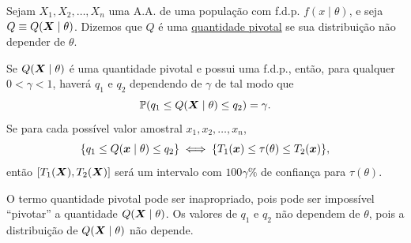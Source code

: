 \begin{definition}
Sejam $X_1,X_2,\ldots,X_n$ uma A.A. de uma população com f.d.p. $f(x\mid\theta)$, e seja $Q\equiv Q(\bm{X}\mid\theta)$. Dizemos que $Q$ é uma \underline{quantidade pivotal} se sua distribuição não depender de $\theta$.
\end{definition}

\begin{theorem}
Se $Q(\bm{X}\mid\theta)$ é uma quantidade pivotal e possui uma f.d.p., então, para qualquer $0<\gamma<1$, haverá $q_1$ e $q_2$ dependendo de $\gamma$ de tal modo que
\begin{equation}
\mathbb{P}(q_1\leq Q(\bm{X}\mid\theta)\leq q_2) = \gamma.
\end{equation}
Se para cada possível valor amostral $x_1,x_2,\ldots,x_n$,
\begin{equation}
\{q_1\leq Q(\bm{x}\mid\theta)\leq q_2\} \iff \{T_1(\bm{x})\leq\tau(\theta)\leq T_2(\bm{x})\},
\end{equation}
então $[T_1(\bm{X}),T_2(\bm{X})]$ será um intervalo com $100\gamma\%$ de confiança para $\tau(\theta)$.
\end{theorem}

\begin{note}
\begin{outline}
	\1 O termo quantidade pivotal pode ser inapropriado, pois pode ser impossível ``pivotar'' a quantidade $Q(\bm{X}\mid\theta)$.
	\1 Os valores de $q_1$ e $q_2$ não dependem de $\theta$, pois a distribuição de $Q(\bm{X}\mid\theta)$ não depende.
\end{outline}
\end{note}

